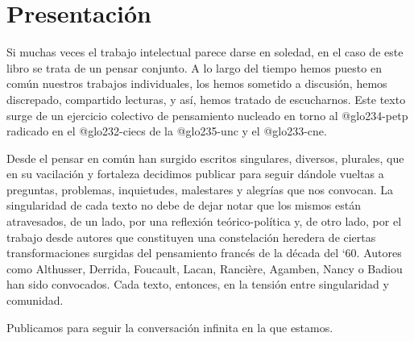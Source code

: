 \ifPDF
\chapter[\hspace{1.5pc}Presentación]{Presentación}
\setcounter{PrimPag}{\theCurrentPage}




Si muchas veces el trabajo intelectual parece darse en soledad, en el caso de este libro se trata de un pensar conjunto. A lo largo del tiempo hemos puesto en común nuestros trabajos individuales, los hemos sometido a discusión, hemos discrepado, compartido lecturas, y así, hemos tratado de escucharnos. Este texto surge de un ejercicio colectivo de pensamiento nucleado en torno al \gls{@glo234-petp} radicado en el \gls{@glo232-ciecs} de la \gls{@glo235-unc} y el \gls{@glo233-cne}.

Desde el pensar en común han surgido escritos singulares, diversos, plurales, que en su vacilación y fortaleza decidimos publicar para seguir dándole vueltas a preguntas, problemas, inquietudes, malestares y alegrías que nos convocan. La singularidad de cada texto no debe de dejar notar que los mismos están atravesados, de un lado, por una reflexión teórico-política y, de otro lado, por el trabajo desde autores que constituyen una constelación heredera de ciertas transformaciones surgidas del pensamiento francés de la década del `60. Autores como Althusser, Derrida, Foucault, Lacan, Rancière, Agamben, Nancy o Badiou han sido convocados. Cada texto, entonces, en la tensión entre singularidad y comunidad.

Publicamos para seguir la conversación infinita en la que estamos.

\ifPDF
{}
\fi